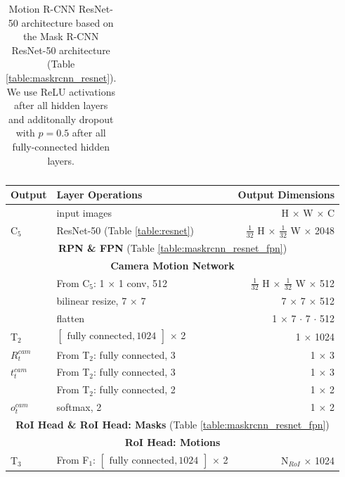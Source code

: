 {\begin{table}[h]
\begin{tabular}{llr}
\bottomrule
\end{tabular}

\caption {
Motion R-CNN ResNet-50 architecture based on the Mask R-CNN
ResNet-50 architecture (Table \ref{table:maskrcnn_resnet}).
We use ReLU activations after all hidden layers and
additonally dropout with $p = 0.5$ after all fully-connected hidden layers.
}
\label{table:motionrcnn_resnet}
\end{table}
}

{
\begin{table}[h]
\centering
\begin{tabular}{llr}
\toprule
\textbf{Output} & \textbf{Layer Operations} & \textbf{Output Dimensions} \\
\midrule\midrule
& input images & H $\times$ W $\times$ C \\
\midrule
C$_5$ & ResNet-50 (Table \ref{table:resnet}) & $\tfrac{1}{32}$ H $\times$ $\tfrac{1}{32}$ W $\times$ 2048 \\
\midrule
\multicolumn{3}{c}{\textbf{RPN \& FPN} (Table \ref{table:maskrcnn_resnet_fpn})} \\
\midrule
\multicolumn{3}{c}{\textbf{Camera Motion Network}}\\
\midrule
& From C$_5$: 1 $\times$ 1 conv, 512 & $\tfrac{1}{32}$ H $\times$ $\tfrac{1}{32}$ W $\times$ 512 \\
& bilinear resize, 7 $\times$ 7 & 7 $\times$ 7 $\times$ 512 \\
& flatten & 1 $\times$ 7 $\cdot$ 7 $\cdot$ 512 \\
T$_2$ & $\begin{bmatrix}\textrm{fully connected}, 1024\end{bmatrix}$ $\times$ 2  & 1 $\times$ 1024 \\
$R_t^{cam}$& From T$_2$: fully connected, 3 & 1 $\times$ 3 \\
$t_t^{cam}$& From T$_2$: fully connected, 3 & 1 $\times$ 3 \\
& From T$_2$: fully connected, 2 & 1 $\times$ 2 \\
$o_t^{cam}$& softmax, 2 & 1 $\times$ 2 \\
\midrule
\multicolumn{3}{c}{\textbf{RoI Head \& RoI Head: Masks} (Table \ref{table:maskrcnn_resnet_fpn})} \\
\midrule
\multicolumn{3}{c}{\textbf{RoI Head: Motions}}\\
\midrule
T$_3$ & From F$_1$: $\begin{bmatrix}\textrm{fully connected}, 1024\end{bmatrix}$ $\times$ 2 & N$_{RoI}$ $\times$ 1024 \\

\end{tabular}
\end{table}}

